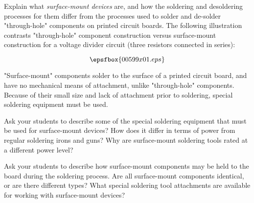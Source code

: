 

Explain what {\it surface-mount devices} are, and how the soldering and desoldering processes for them differ from the processes used to solder and de-solder "through-hole" components on printed circuit boards.  The following illustration contrasts "through-hole" component construction versus surface-mount construction for a voltage divider circuit (three resistors connected in series):

$$\epsfbox{00599x01.eps}$$







"Surface-mount" components solder to the surface of a printed circuit board, and have no mechanical means of attachment, unlike "through-hole" components.  Because of their small size and lack of attachment prior to soldering, special soldering equipment must be used. 







Ask your students to describe some of the special soldering equipment that must be used for surface-mount devices?  How does it differ in terms of power from regular soldering irons and guns?  Why are surface-mount soldering tools rated at a different power level?

Ask your students to describe how surface-mount components may be held to the board during the soldering process.  Are all surface-mount components identical, or are there different types?  What special soldering tool attachments are available for working with surface-mount devices?




